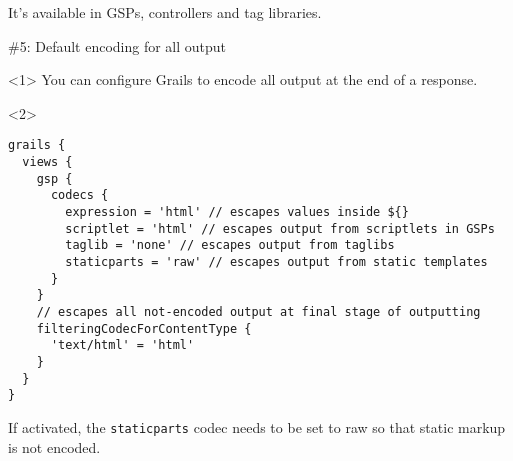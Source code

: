 {\begin{frame}
\begin{onlyenv}
      It's available in GSPs, controllers and tag libraries.
    \end{onlyenv}

\end{frame}



\begin{frame}

    \begin{center}
      \Huge\color{green} \#5: Default encoding for all output
    \end{center}

    \vspace{1cm}

    \begin{onlyenv}<1>
      You can configure Grails to encode all output at the end of a response.
    \end{onlyenv}

    \begin{onlyenv}<2>
      \begin{center}
        \begin{minipage}{1.1\textwidth}
          \begin{verbatim}
grails {
  views {
    gsp {
      codecs {
        expression = 'html' // escapes values inside ${}
        scriptlet = 'html' // escapes output from scriptlets in GSPs
        taglib = 'none' // escapes output from taglibs
        staticparts = 'raw' // escapes output from static templates
      }
    }
    // escapes all not-encoded output at final stage of outputting
    filteringCodecForContentType {
      'text/html' = 'html'
    }
  }
}
          \end{verbatim}
        \end{minipage}
      \end{center}

      If activated, the \verb|staticparts| codec needs to be set to raw so
      that static markup is not encoded.
    \end{onlyenv}

\end{frame}

}
